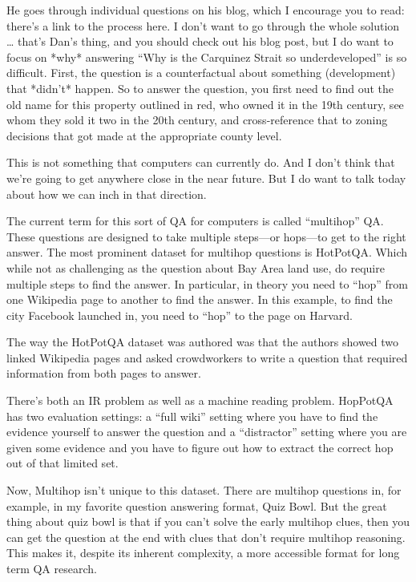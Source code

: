 He goes through individual questions on his blog, which I encourage you to read: there’s a link to the process here.  I don’t want to go through the whole solution … that’s Dan’s thing, and you should check out his blog post, but I do want to focus on *why* answering “Why is the Carquinez Strait so underdeveloped” is so difficult.  First, the question is a counterfactual about something (development) that *didn’t* happen.  So to answer the question, you first need to find out the old name for this property outlined in red, who owned it in the 19th century, see whom they sold it two in the 20th century, and cross-reference that to zoning decisions that got made at the appropriate county level.

This is not something that computers can currently do.  And I don’t think that we’re going to get anywhere close in the near future.  But I do want to talk today about how we can inch in that direction.

The current term for this sort of QA for computers is called “multihop” QA.  These questions are designed to take multiple steps—or hops—to get to the right answer.  The most prominent dataset for multihop questions is HotPotQA.  Which while not as challenging as the question about Bay Area land use, do require multiple steps to find the answer.  In particular, in theory you need to “hop” from one Wikipedia page to another to find the answer.  In this example, to find the city Facebook launched in, you need to “hop” to the page on Harvard.

The way the HotPotQA dataset was authored was that the authors showed two linked Wikipedia pages and asked crowdworkers to write a question that required information from both pages to answer.  

There’s both an IR problem as well as a machine reading problem.  HopPotQA has two evaluation settings: a “full wiki” setting where you have to find the evidence yourself to answer the question and a “distractor” setting where you are given some evidence and you have to figure out how to extract the correct hop out of that limited set.

Now, Multihop isn’t unique to this dataset.  There are multihop questions in, for example, in my favorite question answering format, Quiz Bowl.  But the great thing about quiz bowl is that if you can’t solve the early multihop clues, then you can get the question at the end with clues that don’t require multihop reasoning.  This makes it, despite its inherent complexity, a more accessible format for long term QA research.


